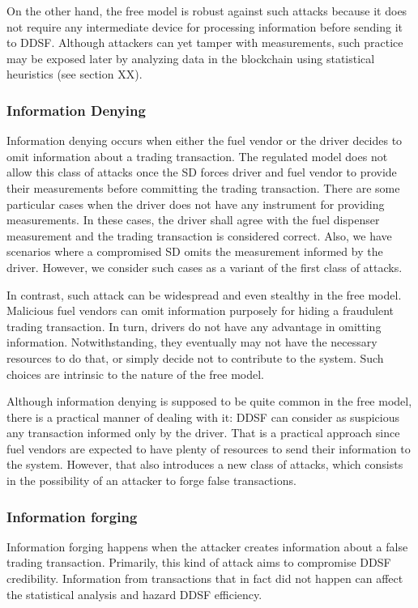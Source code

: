 \documentclass[sigplan]{acmart}
\begin{document}
On the other hand, the free model is robust against such attacks because it does not require any intermediate device for processing information before sending it to DDSF.
Although attackers can yet tamper with measurements, such practice may be exposed later by analyzing data in the blockchain using statistical heuristics (see section XX).

\subsubsection{Information Denying}
Information denying occurs when either the fuel vendor or the driver decides to omit information about a trading transaction.
The regulated model does not allow this class of attacks once the SD forces driver and fuel vendor to provide their measurements before committing the trading transaction.
There are some particular cases when the driver does not have any instrument for providing measurements.
In these cases, the driver shall agree with the fuel dispenser measurement and the trading transaction is considered correct.
Also, we have scenarios where a compromised SD omits the measurement informed by the driver.
However, we consider such cases as a variant of the first class of attacks.

In contrast, such attack can be widespread and even stealthy in the free model.
Malicious fuel vendors can omit information purposely for hiding a fraudulent trading transaction.
In turn, drivers do not have any advantage in omitting information.
Notwithstanding,  they eventually may not have the necessary resources to do that, or simply decide not to contribute to the system.
Such choices are intrinsic to the nature of the free model.

Although information denying is supposed to be quite common in the free model, there is a practical manner of dealing with it: DDSF can consider as suspicious any transaction informed only by the driver.
That is a practical approach since fuel vendors are expected to have plenty of resources to send their information to the system.
However, that also introduces a new class of attacks, which consists in the possibility of an attacker to forge false transactions.

\subsubsection{Information forging}
Information forging happens when the attacker creates information about a false trading transaction.
Primarily, this kind of attack aims to compromise DDSF credibility.
Information from transactions that in fact did not happen can affect the statistical analysis and hazard DDSF efficiency.
\end{document}
